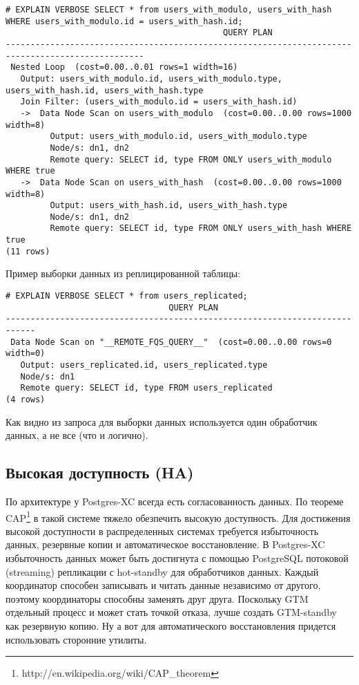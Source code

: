 \begin{lstlisting}[label=lst:postgres-xc8,caption=Выборка записей из распределенной таблицы]
# EXPLAIN VERBOSE SELECT * from users_with_modulo, users_with_hash WHERE users_with_modulo.id = users_with_hash.id;
                                            QUERY PLAN                                            
--------------------------------------------------------------------------------------------------
 Nested Loop  (cost=0.00..0.01 rows=1 width=16)
   Output: users_with_modulo.id, users_with_modulo.type, users_with_hash.id, users_with_hash.type
   Join Filter: (users_with_modulo.id = users_with_hash.id)
   ->  Data Node Scan on users_with_modulo  (cost=0.00..0.00 rows=1000 width=8)
         Output: users_with_modulo.id, users_with_modulo.type
         Node/s: dn1, dn2
         Remote query: SELECT id, type FROM ONLY users_with_modulo WHERE true
   ->  Data Node Scan on users_with_hash  (cost=0.00..0.00 rows=1000 width=8)
         Output: users_with_hash.id, users_with_hash.type
         Node/s: dn1, dn2
         Remote query: SELECT id, type FROM ONLY users_with_hash WHERE true
(11 rows)
\end{lstlisting}

Пример выборки данных из реплицированной таблицы:

\begin{lstlisting}[label=lst:postgres-xc22,caption=Выборка записей из реплицированной таблицы]
# EXPLAIN VERBOSE SELECT * from users_replicated;
                                 QUERY PLAN                                 
----------------------------------------------------------------------------
 Data Node Scan on "__REMOTE_FQS_QUERY__"  (cost=0.00..0.00 rows=0 width=0)
   Output: users_replicated.id, users_replicated.type
   Node/s: dn1
   Remote query: SELECT id, type FROM users_replicated
(4 rows)
\end{lstlisting}

Как видно из запроса для выборки данных используется один обработчик данных, а не все (что и логично).

\subsection{Высокая доступность (HA)}

По архитектуре у Postgres-XC всегда есть согласованность данных. По теореме CAP\footnote{http://en.wikipedia.org/wiki/CAP\_theorem} в такой системе тяжело обезпечить высокую доступность. Для достижения высокой доступности в распределенных системах требуется избыточность данных, резервные копии и автоматическое восстановление. В Postgres-XC избыточность данных может быть достигнута с помощью PostgreSQL потоковой (streaming) репликации с hot-standby для обработчиков данных. Каждый координатор способен записывать и читать данные независимо от другого, поэтому координаторы способны заменять друг друга. Поскольку GTM отдельный процесс и может стать точкой отказа, лучше создать GTM-standby как резервную копию. Ну а вот для автоматического восстановления придется использовать сторонние утилиты.

